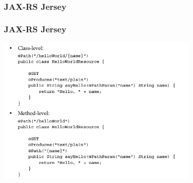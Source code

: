 \documentclass{beamer}
\begin{document}
\subsubsection{JAX-RS Jersey}
\begin{frame}
\frametitle{JAX-RS Jersey}

\includegraphics[width=10cm]{jax.png}
\end{frame}
\end{document}
